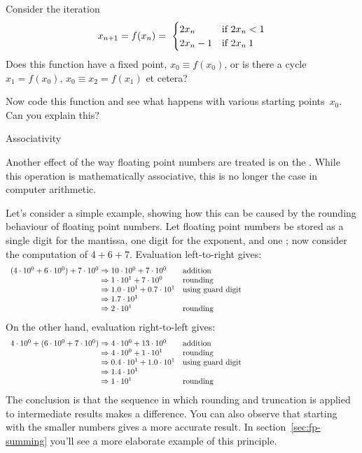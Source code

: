 \begin{comment}
Exercise: sine function through power series. How to deal with the
alternating signs?
\end{comment}

\begin{exercise}
  Consider the iteration
  \[ x_{n+1}=f(x_n) = \
  \begin{cases}
    2x_n&\hbox{if $2x_n<1$}\\
    2x_n-1&\hbox{if $2x_n\>1$}\\
  \end{cases}
  \]
  Does this function have a fixed point, $x_0\equiv f(x_0)$, or is there a cycle
  $x_1=f(x_0),\,x_0\equiv x_2=f(x_1)$ et cetera?

  Now code this function and see what happens with various starting
  points~$x_0$. Can you explain this?
\end{exercise}

 {Associativity}
\label{sec:fp-associative}

Another effect of the way floating point numbers are treated
is on the .
While this operation is mathematically associative, this is no longer
the case in computer arithmetic.

Let's consider a simple example, showing how this can be caused
by the rounding behaviour of floating point numbers.
Let floating point numbers be stored as a single digit for the mantissa,
one digit for the exponent, and one \indexterm{guard digit};
now consider the computation of $4+6+7$.
Evaluation left-to-right gives:
\[ 
\begin{array}{l@{{}\Rightarrow{}}lp{3in}}
(4\cdot10^0 + 6\cdot10^0)+7\cdot10^0&10\cdot10^0+7\cdot10^0&addition\\
&1\cdot 10^1 + 7\cdot10^0&rounding\\
&1.0\cdot 10^1 + 0.7\cdot10^1&using guard digit\\
&1.7\cdot 10^1\\
&2\cdot10^1&rounding
\end{array}
\]
On the other hand, evaluation right-to-left gives:
\[ 
\begin{array}{l@{{}\Rightarrow{}}lp{3in}}
4\cdot10^0 + (6\cdot10^0 + 7\cdot10^0)&4\cdot 10^0 + 13\cdot10^0&addition\\
&4\cdot 10^0 + 1\cdot10^1&rounding\\
&0.4\cdot 10^1 + 1.0\cdot10^1&using guard digit\\
&1.4\cdot 10^1\\
&1\cdot10^1&rounding
\end{array}
\]
The conclusion is that the sequence in which rounding and truncation is applied to
intermediate results makes a difference. You can also observe that starting with the smaller
numbers gives a more accurate result.
In section~\ref{sec:fp-summing} you'll see a more elaborate example of this principle.

